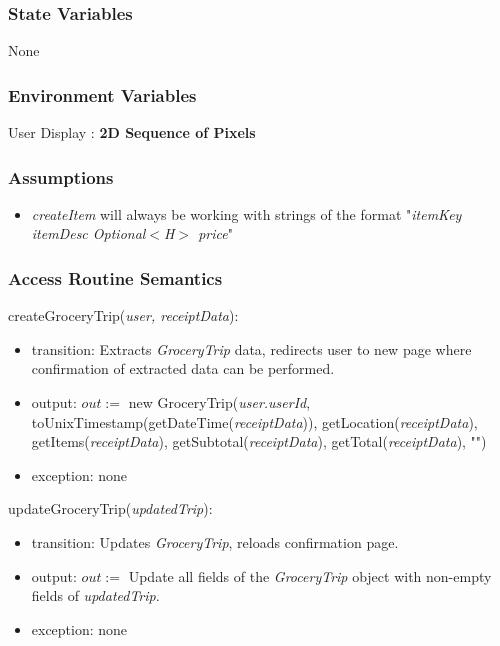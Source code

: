 \documentclass[12pt, titlepage]{article}
\begin{document}
\subsubsection{State Variables}

None

\subsubsection{Environment Variables}

User Display : \textbf{2D Sequence of Pixels} 

\subsubsection{Assumptions}
\begin{itemize}
  \item \textit{createItem} will always be working with strings of the format "\textit{itemKey itemDesc Optional$<$H$>$ price}"
\end{itemize}

\subsubsection{Access Routine Semantics}

\noindent createGroceryTrip(\textit{user, receiptData}):
\begin{itemize}
  \item transition: Extracts \textit{GroceryTrip} data, redirects user to new page where confirmation
of extracted data can be performed.
  \item output: $out :=$ new GroceryTrip(\textit{user.userId}, toUnixTimestamp(getDateTime(\textit{receiptData})), getLocation(\textit{receiptData}),
                        getItems(\textit{receiptData}), getSubtotal(\textit{receiptData}), getTotal(\textit{receiptData}), "")
  \item exception: none
\end{itemize}

\noindent updateGroceryTrip(\textit{updatedTrip}):
\begin{itemize}
  \item transition: Updates \textit{GroceryTrip}, reloads confirmation page.
  \item output: $out :=$ Update all fields of the \textit{GroceryTrip} object with non-empty fields of \textit{updatedTrip}.
  \item exception: none
\end{itemize}
\end{document}
